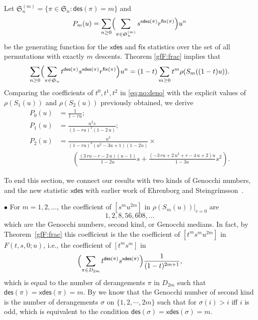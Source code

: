 \documentclass[12pt]{amsart}
\numberwithin{equation}{section}
\theoremstyle{plain}
\theoremstyle{definition}
\def\xdes{\mathsf{xdes}}
\def\fix{\mathsf{fix}}
\def\des{\mathsf{des}}
\def\S{\mathfrak{S}}
\begin{document}
Let $\S_n^{(m)} = \{ \pi \in \S_n : \des(\pi)=m\}$ and 
\begin{equation}\label{def:Pj}
	P_m(u) =  \sum_{n\geq 0}\Bigl(	\sum_{\pi \in \S_n^{(m)}} s^{\xdes(\pi)} r^{\fix(\pi)}\Bigr) u^n
\end{equation}
be the generating function for the $\xdes$ and $\fix$ statistics over the 
set of all permutations with exactly $m$ descents.
Theorem \ref{gfF:frac} implies that
\begin{equation}\label{eq:no:deno}
\sum_{n\geq 0} \Bigl( \sum_{\pi\in \S_n} 
	 t^{\des(\pi)}  s^{\xdes(\pi)}  r^{\fix(\pi)}\Bigr)  {u^n}
	 = (1-t)\sum_{m\geq 0} t^m \rho(S_m((1-t)u)).
\end{equation}
Comparing the coefficients of $t^0, t^1, t^2$ in \eqref{eq:no:deno} with
the explicit values of $\rho(S_1(u))$ and $\rho(S_2(u))$ previously obtained, we derive
\begin{align*}
	P_0(u)
		&=  \frac{1}{1- r u }; \\
		P_1(u)
		&= 
\frac{u^{2} s}{{\left(1-r u \right)}^{2} {\left(1-2 \, u \right)}};
		 \\
		
		P_2(u)
		&=  
		\frac{u^3}{(1-ru)^3(u^2-3u+1)(1-2u)}  \times \\
		& \qquad \left(
	\frac{ {\left(3 \, r u - r - 2 \, u\right)} {\left(u - 1\right)}  }{ {1-2 u }} s 
	+ \frac{{\left(-3 \, r u + 2 \, u^{2} + r - 4 \, u + 2\right)} u }{1-3u} s^2 \right).\nonumber
\end{align*}


To end this section, we connect our results with two kinds of Genocchi numbers, and the new statistic $\xdes$ with earlier work of Ehrenborg and Steingr\'imsson~\cite{es}.

$\bullet$ For $m=1,2,\ldots$, the coefficient of $[s^m u^{2m}]$ in $\rho(S_m(u))|_{r=0}$ are
$$
1,2,8,56,608, \ldots 
$$
which are the Genocchi numbers, second kind, or Genocchi medians.
In fact, by Theorem~\ref{gfF:frac} this coefficient is the the coefficient of
$[t^m s^m u^{2m}]$ in $F(t,s,0;u)$, i.e., the coefficient of $[t^m s^m]$ in
\begin{equation*}
	\Bigl( \sum_{\pi\in D_{2m}} 
	 t^{\des(\pi)}  s^{\xdes(\pi)} \Bigr) \frac {1}{(1-t)^{2m+1}},
\end{equation*}
which is equal to the number of derangements $\pi$ in $D_{2m}$ such that $\des(\pi)=\xdes(\pi)=m$. By \cite{Dumont1994Rand} we know that the Genocchi number of second kind 
is the number of derangements $\sigma$ on $\{1,2,\cdots, 2m\}$ such that 
for $\sigma(i)>i$ iff $i$ is odd, which is equivalent to the condition $\des(\sigma)=\xdes(\sigma)=m$.
\end{document}
